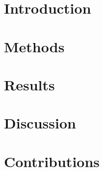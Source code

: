 \documentclass[unnumsec,webpdf,contemporary,large]{oup-authoring-template}%
\begin{document}
\section{Introduction}


\section{Methods}


\section{Results}


\section{Discussion}


\section{Contributions}



%
%






\end{document}
